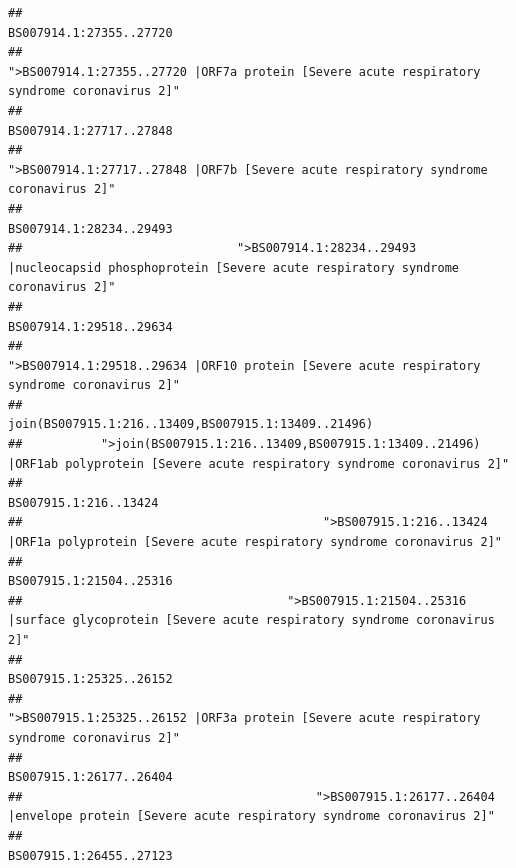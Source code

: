 \documentclass[
]{article}
\begin{document}
\begin{verbatim}
##                                                                                                                BS007914.1:27355..27720 
##                                            ">BS007914.1:27355..27720 |ORF7a protein [Severe acute respiratory syndrome coronavirus 2]" 
##                                                                                                                BS007914.1:27717..27848 
##                                                    ">BS007914.1:27717..27848 |ORF7b [Severe acute respiratory syndrome coronavirus 2]" 
##                                                                                                                BS007914.1:28234..29493 
##                              ">BS007914.1:28234..29493 |nucleocapsid phosphoprotein [Severe acute respiratory syndrome coronavirus 2]" 
##                                                                                                                BS007914.1:29518..29634 
##                                            ">BS007914.1:29518..29634 |ORF10 protein [Severe acute respiratory syndrome coronavirus 2]" 
##                                                                                    join(BS007915.1:216..13409,BS007915.1:13409..21496) 
##           ">join(BS007915.1:216..13409,BS007915.1:13409..21496) |ORF1ab polyprotein [Severe acute respiratory syndrome coronavirus 2]" 
##                                                                                                                  BS007915.1:216..13424 
##                                          ">BS007915.1:216..13424 |ORF1a polyprotein [Severe acute respiratory syndrome coronavirus 2]" 
##                                                                                                                BS007915.1:21504..25316 
##                                     ">BS007915.1:21504..25316 |surface glycoprotein [Severe acute respiratory syndrome coronavirus 2]" 
##                                                                                                                BS007915.1:25325..26152 
##                                            ">BS007915.1:25325..26152 |ORF3a protein [Severe acute respiratory syndrome coronavirus 2]" 
##                                                                                                                BS007915.1:26177..26404 
##                                         ">BS007915.1:26177..26404 |envelope protein [Severe acute respiratory syndrome coronavirus 2]" 
##                                                                                                                BS007915.1:26455..27123 

\end{verbatim}
\end{document}
